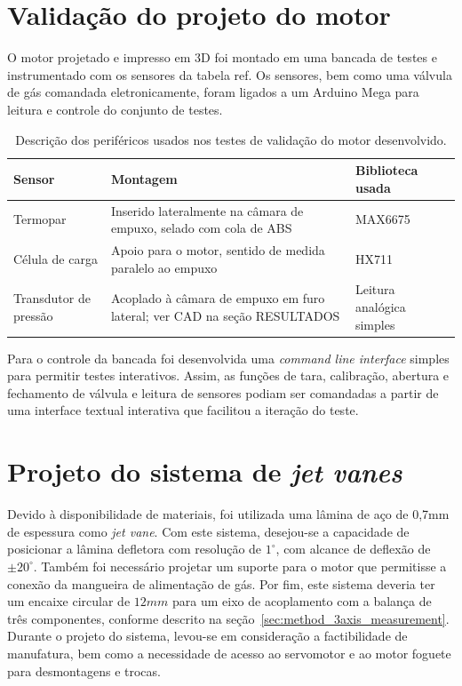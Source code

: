 \section{Validação do projeto do motor}\label{sec:method_validation}

O motor projetado e impresso em 3D foi montado em uma bancada de testes e instrumentado com os sensores da tabela ref. Os sensores, bem como uma válvula de gás comandada eletronicamente, foram ligados a um Arduino Mega para leitura e controle do conjunto de testes. 


\begin{table}[htbp]
    \centering\begin{tabular}{p{}p{}p{}} \toprule
        Sensor & Montagem & Biblioteca usada \\ \midrule
        Termopar & Inserido lateralmente na câmara de empuxo, selado com cola de ABS & MAX6675 \\
        Célula de carga & Apoio para o motor, sentido de medida paralelo ao empuxo & HX711 \\
        Transdutor de pressão & Acoplado à câmara de empuxo em furo lateral; ver CAD na seção RESULTADOS & Leitura analógica simples \\ \bottomrule
    \end{tabular}
    \caption{Descrição dos periféricos usados nos testes de validação do motor desenvolvido.}\label{tab:validation_peripherals}
\end{table}

Para o controle da bancada foi desenvolvida uma \textit{command line interface} simples para permitir testes interativos. Assim, as funções de tara, calibração, abertura e fechamento de válvula e leitura de sensores podiam ser comandadas a partir de uma interface textual interativa que facilitou a iteração do teste.

\section{Projeto do sistema de \textit{jet vanes}}\label{sec:method_jet_vanes}

Devido à disponibilidade de materiais, foi utilizada uma lâmina de aço de 0,7mm de espessura como \textit{jet vane}. Com este sistema, desejou-se a capacidade de posicionar a lâmina defletora com resolução de \(1^\circ \), com alcance de deflexão de \(\pm 20^\circ \). Também foi necessário projetar um suporte para o motor que permitisse a conexão da mangueira de alimentação de gás. Por fim, este sistema deveria ter um encaixe circular de \(12mm\) para um eixo de acoplamento com a balança de três componentes, conforme descrito na seção~\ref{sec:method_3axis_measurement}. Durante o projeto do sistema, levou-se em consideração a factibilidade de manufatura, bem como a necessidade de acesso ao servomotor e ao motor foguete para desmontagens e trocas.

